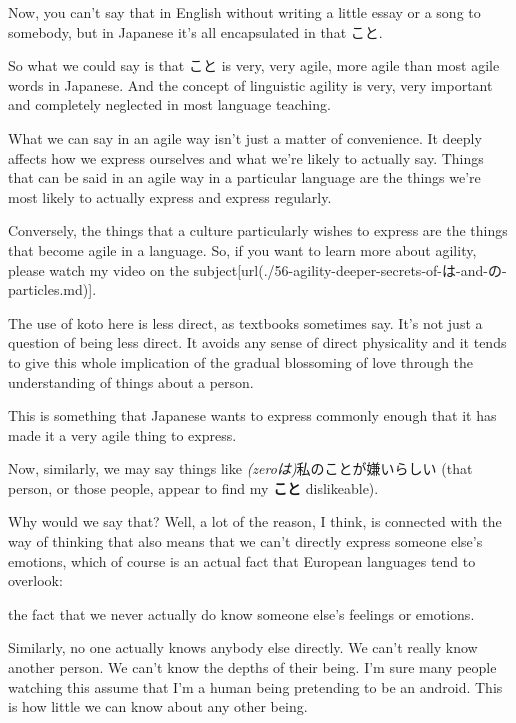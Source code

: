 {}

Now, you can't say that in English without writing a little essay or a song to somebody, but in Japanese it's all encapsulated in that こと.

So what we could say is that こと is very, very agile, more agile than most agile words in Japanese. And the concept of linguistic agility is very, very important and completely neglected in most language teaching.

What we can say in an agile way isn't just a matter of convenience. It deeply affects how we express ourselves and what we're likely to actually say. Things that can be said in an agile way in a particular language are the things we're most likely to actually express and express regularly.

Conversely, the things that a culture particularly wishes to express are the things that become agile in a language. So, if you want to learn more about agility, please watch my video on the subject\goto{{[}56{]}}[url(./56-agility-deeper-secrets-of-は-and-の-particles.md)].

The use of koto here is less direct, as textbooks sometimes say. It's not just a question of being less direct. It avoids any sense of direct physicality and it tends to give this whole implication of the gradual blossoming of love through the understanding of things about a person.

This is something that Japanese wants to express commonly enough that it has made it a very agile thing to express.

\stopsectionlevel

\startsectionlevel[title={私のことが嫌い},reference={私のことが嫌い}]

Now, similarly, we may say things like {\em (zeroは)}私のことが嫌いらしい (that person, or those people, appear to find my {\bf こと} dislikeable).

{}

Why would we say that? Well, a lot of the reason, I think, is connected with the way of thinking that also means that we can't directly express someone else's emotions, which of course is an actual fact that European languages tend to overlook:

the fact that we never actually do know someone else's feelings or emotions.

Similarly, no one actually knows anybody else directly. We can't really know another person. We can't know the depths of their being. I'm sure many people watching this assume that I'm a human being pretending to be an android. This is how little we can know about any other being.

